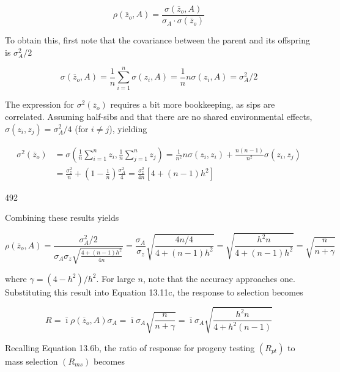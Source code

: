 \documentclass{article}
\begin{document}
\begin{equation}
\rho(\overline{z}_{o},A)=\frac{\sigma(\overline{z}_{o},A)}{\sigma_{A}\cdot\sigma(\overline{z}_{o})}
\end{equation}

To obtain this, first note that the covariance between the parent and its offspring is  $ \sigma_{A}^{2}/2 $

\begin{equation}
\sigma(\overline{z}_{o},A)=\frac{1}{n}\sum_{i=1}^{n}\sigma\left(z_{i},A\right)=\frac{1}{n}n\sigma(z_{i},A)=\sigma_{A}^{2}/2
\end{equation}

The expression for  $ \sigma^2(\overline{z}_o) $ requires a bit more bookkeeping, as sips are correlated. Assuming half-sibs and that there are no shared environmental effects,  $ \sigma(z_i, z_j) = \sigma_A^2/4 $ (for  $ i \neq j $), yielding

\begin{equation}
\begin{align*}\sigma^{2}(\overline{z}_{o})&=\sigma\left(\frac{1}{n}\sum_{i=1}^{n}z_{i},\frac{1}{n}\sum_{j=1}^{n}z_{j}\right)=\frac{1}{n^{2}}n\sigma(z_{i},z_{i})+\frac{n(n-1)}{n^{2}}\sigma(z_{i},z_{j})\\&=\frac{\sigma_{z}^{2}}{n}+\left(1-\frac{1}{n}\right)\frac{\sigma_{A}^{2}}{4}=\frac{\sigma_{z}^{2}}{4n}\left[4+(n-1)h^{2}\right]\end{align*}
\end{equation}

492

Combining these results yields

\begin{equation}
\rho(\overline{z}_{o},A)=\frac{\sigma_{A}^{2}/2}{\sigma_{A}\sigma_{z}\sqrt{\frac{4+(n-1)h^{2}}{4n}}}=\frac{\sigma_{A}}{\sigma_{z}}\sqrt{\frac{4n/4}{4+(n-1)h^{2}}}=\sqrt{\frac{h^{2}n}{4+(n-1)h^{2}}}=\sqrt{\frac{n}{n+\gamma}}
\end{equation}

where  $ \gamma = (4 - h^2)/h^2 $. For large  $ n $, note that the accuracy approaches one. Substituting this result into Equation 13.11c, the response to selection becomes

\begin{equation}
R=\bar{\imath}\rho(\overline{z}_{o},A)\sigma_{A}=\bar{\imath}\sigma_{A}\sqrt{\frac{n}{n+\gamma}}=\bar{\imath}\sigma_{A}\sqrt{\frac{h^{2}n}{4+h^{2}(n-1)}}
\end{equation}

Recalling Equation 13.6b, the ratio of response for progeny testing  $ (R_{pt}) $ to mass selection  $ (R_{ms}) $ becomes
\end{document}
